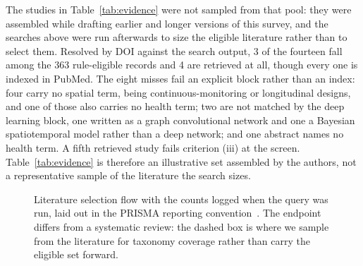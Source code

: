 \documentclass[journal]{IEEEtran}
\providecommand{\Description}[1]{}
\newif\ifsubmission
\begin{document}
The studies in Table~\ref{tab:evidence} were not sampled from that pool: they were assembled while drafting earlier and longer versions of this survey, and the searches above were run afterwards to size the eligible literature rather than to select them. Resolved by DOI against the search output, 3 of the fourteen fall among the 363 rule-eligible records and 4 are retrieved at all, though every one is indexed in PubMed.\ifsubmission\else{} The eight misses fail an explicit block rather than an index: four carry no spatial term, being continuous-monitoring or longitudinal designs, and one of those also carries no health term; two are not matched by the deep learning block, one written as a graph convolutional network and one a Bayesian spatiotemporal model rather than a deep network; and one abstract names no health term. A fifth retrieved study fails criterion (iii) at the screen.\fi{} Table~\ref{tab:evidence} is therefore an illustrative set assembled by the authors, not a representative sample of the literature the search sizes.

\begin{figure}[t]
\centering
\footnotesize
{}
\caption{Literature selection flow with the counts logged when the query was run, laid out in the PRISMA reporting convention~\cite{page2021prisma}. The endpoint differs from a systematic review: the dashed box is where we sample from the literature for taxonomy coverage rather than carry the eligible set forward.}
\Description{A vertical flow diagram of the literature selection process, from sources and query through an unlogged screening stage, eligibility criteria, a quality and saturation gate, to the included studies.}
\label{fig:prisma}
\end{figure}
\end{document}
